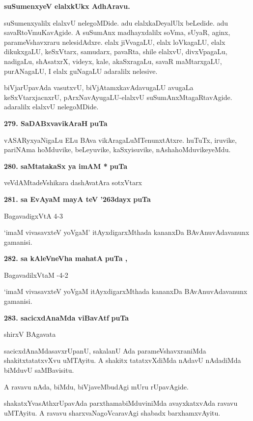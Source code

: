 \smallskip
\noindent
{\textbf{suSumenxyeV elalxkUkx AdhAravu.}}
\smallskip

suSumenxyalilx elalxvU nelegoMDide. adu elalxkaDeyalUlx beLedide. adu savaRtoVmuKa\-vAgide. A suSumAnx madhayxdalilx soVma, sUyaR, aginx, parameVshavxraru nelesidAdxre. elalx jiVvagaLU, elalx loVkagaLU, elalx dikukxgaLU, keSxVtarx, samudarx, pavaRta, shile elalxvU, divxVpagaLu, nadigaLu, shAsatxrX, videyx, kale, akaSxragaLu, savaR maMtarxgaLU, purANagaLU, I elalx guNagaLU adaralilx nelesive.

biVjarUpavAda vasutxvU, biVjAtamxkavAdavugaLU avugaLa keSxVtarxjacnxrU, pArxNavAyugaLU-elalxvU suSumAnxMtagaRtavAgide. adaralilx elalxvU nelegoMDide.

\medskip
\noindent
\textbf{279. SaDABxvavikAraH} \hfill{\bf puTa \pageref{226}}

\smallskip
vASARyxyaNigaLu ELu BAva vikAragaLuMTenunxtAtxre. huTuTx, iruvike, pariNAma hoMduvike, beLeyuvike, kaSxyisuvike, nAshahoMduvikeyeMdu.

\medskip
\noindent
\textbf{280. saMtatakaSx ya imAM *} \hfill{\bf puTa \pageref{213}}

\hfill{veVdAMtadeVshikara dashAvatAra sotxVtarx}

\medskip
\noindent
\textbf{281. sa EvAyaM mayA teV \char'263dayx} \hfill{\bf puTa \pageref{107}}

\hfill{BagavadigxVtA 4-3}

\smallskip
`imaM vivasavxteV yoVgaM' itAyxdigarxMthada kananxDa BAvAnuvAdavanunx gamanisi.

\medskip
\noindent
\textbf{282. sa kAleVneVha mahatA} \hfill{\bf puTa \pageref{70}, \pageref{62}}

\hfill{BagavadilxVtaM -4-2}

\smallskip
`imaM vivasavxteV yoVgaM itAyxdigarxMthada kananxDa BAvAnuvAdavanunx gamanisi.

\medskip
\noindent
\textbf{283. sacicxdAnaMda viBavAtf} \hfill{\bf puTa \pageref{157}}

\hfill{shirxV BAgavata}

\smallskip
sacicxdAnaMdasavxrUpanU, sakalanU Ada parameVshavxraniMda shakitxtatatxvXvu uMTA\-yitu. A shakitx tatatxvX\-diMda nAdavU nAdadiMda biMduvU saMBavisitu.

A ravavu nAda, biMdu, biVjaveMbudAgi mUru rUpavAgide.

shakatxYvasAthxrUpavAda parxthamabiMduviniMda avayxkatxvAda ravavu uMTAyitu. A ravavu sharxvaNa\-goVcara\-vAgi shabadx barxhamxvAyitu.

